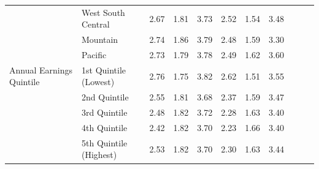 \begin{tabular}{llccc|ccc|ccc}
&West South Central&2.67&1.81&3.73&2.52&1.54&3.48&&&\\
&Mountain&2.74&1.86&3.79&2.48&1.59&3.30&&&\\
&Pacific&2.73&1.79&3.78&2.49&1.62&3.60&&&\\
Annual Earnings Quintile&1st Quintile (Lowest)&2.76&1.75&3.82&2.62&1.51&3.55&&&\\
&2nd Quintile&2.55&1.81&3.68&2.37&1.59&3.47&&&\\
&3rd Quintile&2.48&1.82&3.72&2.28&1.63&3.40&&&\\
&4th Quintile&2.42&1.82&3.70&2.23&1.66&3.40&&&\\
&5th Quintile (Highest)&2.53&1.82&3.70&2.30&1.63&3.44&&&\\
\hline\hline
\end{tabular}
